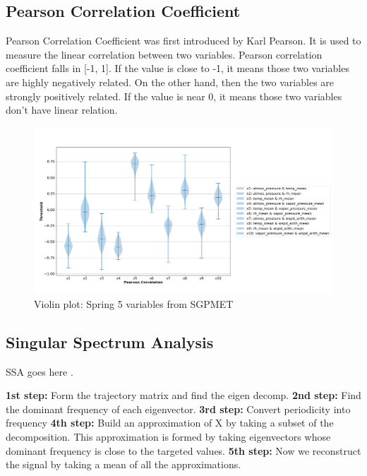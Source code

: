 \documentclass[letterpaper, 10 pt, conference]{ieeeconf}  %
\begin{document}
\subsection{Pearson Correlation Coefficient} 
Pearson Correlation Coefficient was first introduced by Karl Pearson\cite{pearson1895note}. 
It is used to measure the linear correlation between two variables. Pearson correlation 
coefficient falls in [-1, 1]. If the value is close to -1, it means those two variables are 
highly negatively related. On the other hand, then the two variables are strongly positively 
related. If the value is near 0, it means those two variables don't have linear relation.  
\begin{figure}[ht]
    \centering
    \includegraphics[width=\textwidth]{Spring.png}
    \caption{Violin plot: Spring 5 variables from SGPMET}
    \label{fig:pc}
\end{figure}

\subsection{Singular Spectrum Analysis}
SSA goes here \cite{golyandina2013singular, alexandrov2008method}.

\textbf{1st step:} Form the trajectory matrix and find the eigen decomp.
\textbf{2nd step:} Find the dominant frequency of each eigenvector.
\textbf{3rd step:} Convert periodicity into frequency
\textbf{4th step:} Build an approximation of X by taking a subset of the decomposition. This approximation is formed by taking eigenvectors whose dominant frequency is close to the targeted values.
\textbf{5th step:} Now we reconstruct the signal by taking a mean of all the approximations. 
\end{document}
